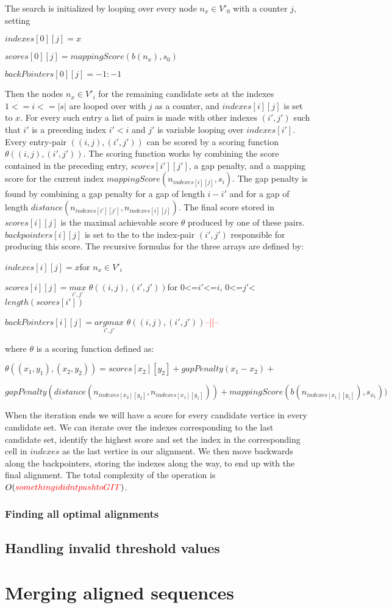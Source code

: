 \documentclass[thesis.tex]{subfiles}
\begin{document}
The search is initialized by looping over every node $n_x \in V'_0$ with a counter $j$, setting\\
\par
$indexes[0][j] = x$\par
$scores[0][j] = mappingScore(b(n_x), s_0)$\par
$backPointers[0][j] = -1:-1$\\
\par\noindent
Then the nodes $n_x \in V'_i$ for the remaining candidate sets at the indexes $1<=i<=|s|$ are looped over with $j$ as a counter, and $indexes[i][j]$ is set to $x$. For every such entry a list of pairs is made with other indexes $(i', j')$ such that $i'$ is a preceding index $i'<i$ and $j'$ is variable looping over $indexes[i']$. Every entry-pair $((i, j), (i', j'))$ can be scored by a scoring function $\theta((i, j), (i', j'))$. The scoring function works by combining the score contained in the preceding entry, $scores[i'][j']$, a gap penalty, and a mapping score for the current index $mappingScore(n_{indexes[i][j]}, s_i)$. The gap penalty is found by combining a gap penalty for a gap of length $i-i'$ and for a gap of length $distance(n_{indexes[i'][j']}, n_{indexes[i][j]})$. The final score stored in $scores[i][j]$ is the maximal achievable score $\theta$ produced by one of these pairs. $backpointers[i][j]$ is set to the to the index-pair $(i', j')$ responsible for producing this score. The recursive formulas for the three arrays are defined by:\\
\par
$indexes[i][j] = x$\quad for $n_x \in V'_i$\par
$scores[i][j] = \underset{i', j'}{max}$ $\theta((i, j), (i', j'))$\quad for $0$<=$i'$<=$i$, $0$<=$j'$<$length(scores[i'])$\par
$backPointers[i][j] = \underset{i', j'}{arg max}$ $\theta((i, j), (i', j'))$\quad \textcolor{red}{--||--}\par
\par\noindent
where $\theta$ is a scoring function defined as:\\
\par
$\theta((x_1, y_1), (x_2, y_2))=scores[x_2][y_2] + gapPenalty(x_1-x_2) +$\par$ gapPenalty(distance(n_{indexes[x_2][y_2]}, n_{indexes[x_1][y_1]})) + mappingScore(b(n_{indexes[x_1][y_1]}), s_{x_1}))$
\par\noindent
When the iteration ends we will have a score for every candidate vertice in every candidate set. We can iterate over the indexes corresponding to the last candidate set, identify the highest score and set the index in the corresponding cell in $indexes$ as the last vertice in our alignment. We then move backwards along the backpointers, storing the indexes along the way, to end up with the final alignment. The total complexity of the operation is $O(\textcolor{red}{something i didnt push to GIT})$.
\subsubsection{Finding all optimal alignments}
\label{sec:all_optimal_alignments}
\subsection{Handling invalid threshold values}
\section{Merging aligned sequences}
\end{document}
